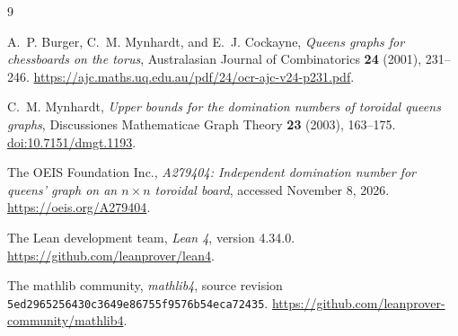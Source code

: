 \documentclass[11pt,a4paper]{article}
\theoremstyle{remark}
\begin{document}
\begin{thebibliography}{9}
\raggedright
{}
A.~P. Burger, C.~M. Mynhardt, and E.~J. Cockayne,
\emph{Queens graphs for chessboards on the torus},
Australasian Journal of Combinatorics \textbf{24} (2001), 231--246.
\url{https://ajc.maths.uq.edu.au/pdf/24/ocr-ajc-v24-p231.pdf}.

C.~M. Mynhardt,
\emph{Upper bounds for the domination numbers of toroidal queens graphs},
Discussiones Mathematicae Graph Theory \textbf{23} (2003), 163--175.
\href{https://doi.org/10.7151/dmgt.1193}{doi:10.7151/dmgt.1193}.

The OEIS Foundation Inc.,
\emph{A279404: Independent domination number for queens' graph on an
$n\times n$ toroidal board}, accessed November 8, 2026.
\url{https://oeis.org/A279404}.

The Lean development team,
\emph{Lean 4}, version 4.34.0.
\url{https://github.com/leanprover/lean4}.

The mathlib community,
\emph{mathlib4}, source revision
\texttt{5ed2965256430c3649e86755f9576b54eca72435}.
\url{https://github.com/leanprover-community/mathlib4}.
\end{thebibliography}
\end{document}
